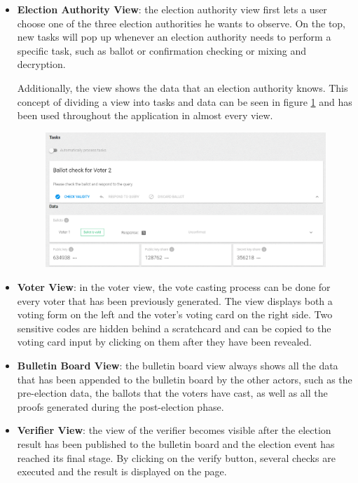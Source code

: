 \begin{itemize}
	\item \textbf{Election Authority View}: the election authority view first lets a user choose one of the three election authorities he wants to observe. On the top, new tasks will pop up whenever an election authority needs to perform a specific task, such as ballot or confirmation checking or mixing and decryption.

Additionally, the view shows the data that an election authority knows. This concept of dividing a view into tasks and data can be seen in figure \ref{Election Authority View} and has been used throughout the application in almost every view.

\begin{figure}[p]
\begin{center}
\includegraphics[scale=0.43]{assets/screenshots/view.png}
\label{Election Authority View}%
\end{center}
\end{figure}

	\item \textbf{Voter View}: in the voter view, the vote casting process can be done for every voter that has been previously generated. The view displays both a voting form on the left and the voter's voting card on the right side. Two sensitive codes are hidden behind a scratchcard and can be copied to the voting card input by clicking on them after they have been revealed.

	\item \textbf{Bulletin Board View}: the bulletin board view always shows all the data that has been appended to the bulletin board by the other actors, such as the pre-election data, the ballots that the voters have cast, as well as all the proofs generated during the post-election phase.

	\item \textbf{Verifier View}: the view of the verifier becomes visible after the election result has been published to the bulletin board and the election event has reached its final stage. By clicking on the verify button, several checks are executed and the result is displayed on the page.
\end{itemize}

